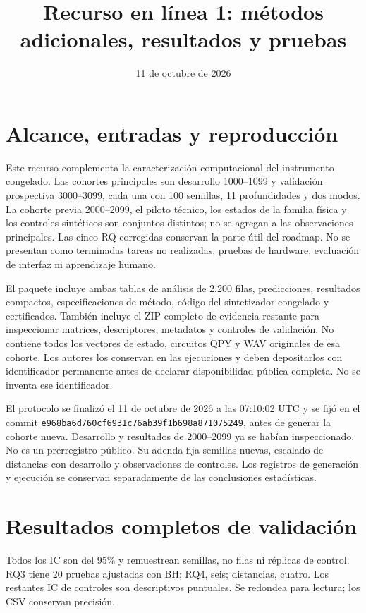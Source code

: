 \documentclass[11pt,a4paper]{article}
\title{Recurso en línea 1: métodos adicionales, resultados y pruebas}\author{}\date{11 de octubre de 2026}
\begin{document}
\maketitle

\section{Alcance, entradas y reproducción}
Este recurso complementa la caracterización computacional del instrumento congelado. Las cohortes principales son desarrollo 1000--1099 y validación prospectiva 3000--3099, cada una con 100 semillas, 11 profundidades y dos modos. La cohorte previa 2000--2099, el piloto técnico, los estados de la familia física y los controles sintéticos son conjuntos distintos; no se agregan a las observaciones principales. Las cinco RQ corregidas conservan la parte útil del roadmap. No se presentan como terminadas tareas no realizadas, pruebas de hardware, evaluación de interfaz ni aprendizaje humano.

El paquete incluye ambas tablas de análisis de 2.200 filas, predicciones, resultados compactos, especificaciones de método, código del sintetizador congelado y certificados. También incluye el ZIP completo de evidencia restante para inspeccionar matrices, descriptores, metadatos y controles de validación. No contiene todos los vectores de estado, circuitos QPY y WAV originales de esa cohorte. Los autores los conservan en las ejecuciones y deben depositarlos con identificador permanente antes de declarar disponibilidad pública completa. No se inventa ese identificador.

El protocolo se finalizó el 11 de octubre de 2026 a las 07:10:02 UTC y se fijó en el commit \texttt{e968ba6d760cf6931c76ab39f1b698a871075249}, antes de generar la cohorte nueva. Desarrollo y resultados de 2000--2099 ya se habían inspeccionado. No es un prerregistro público. Su adenda fija semillas nuevas, escalado de distancias con desarrollo y observaciones de controles. Los registros de generación y ejecución se conservan separadamente de las conclusiones estadísticas.

\section{Resultados completos de validación}
Todos los IC son del 95\% y remuestrean semillas, no filas ni réplicas de control. RQ3 tiene 20 pruebas ajustadas con BH; RQ4, seis; distancias, cuatro. Los restantes IC de controles son descriptivos puntuales. Se redondea para lectura; los CSV conservan precisión.
\end{document}
